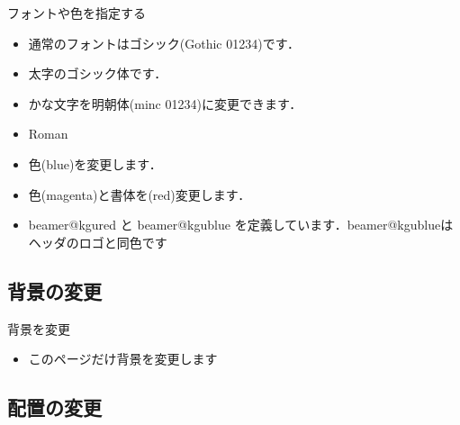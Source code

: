\begin{frame}{フォントや色を指定する}
  \begin{itemize}
    \item 通常のフォントはゴシック(Gothic 01234)です．
    \item {\bgoth 太字のゴシック体です．}
    \item {\minc かな文字を明朝体(minc 01234)に変更できます．}
    \item {\rm Roman }
    \item {\color{blue}色(blue)を変更します．}
    \item {\color{magenta}\bgoth 色(magenta)と書体を}{\color{red}\bgoth (red)変更します．}
    \item {\color{beamer@kgured}\bgoth beamer@kgured} と {\color{beamer@kgublue}\bgoth beamer@kgublue} を定義しています．{\color{beamer@kgublue}\bgoth beamer@kgublueはヘッダのロゴと同色です}
  \end{itemize}
\end{frame}

\subsection{背景の変更}
{
\begin{frame}{背景を変更}
  \begin{itemize}
    \item このページだけ背景を変更します
  \end{itemize}
\end{frame}
}

\subsection{配置の変更}

